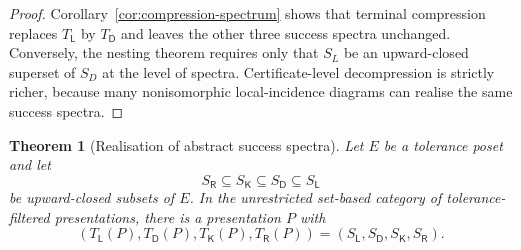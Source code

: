 \documentclass[11pt]{article}
\theoremstyle{plain}
\newtheorem{theorem}{Theorem}[section]
\theoremstyle{definition}
\theoremstyle{remark}
\begin{document}
\begin{proof}
Corollary~\ref{cor:compression-spectrum} shows that terminal compression replaces
$T_{\mathsf L}$ by $T_{\mathsf D}$ and leaves the other three success spectra
unchanged. Conversely, the nesting theorem requires only that $S_L$ be an
upward-closed superset of $S_D$ at the level of spectra. Certificate-level
decompression is strictly richer, because many nonisomorphic local-incidence
diagrams can realise the same success spectra.
\end{proof}

\begin{theorem}[Realisation of abstract success spectra]
\label{thm:abstract-spectrum-realisation}
Let $E$ be a tolerance poset and let
\[
S_{\mathsf R}\subseteq S_{\mathsf K}\subseteq S_{\mathsf D}\subseteq S_{\mathsf L}
\]
be upward-closed subsets of $E$. In the unrestricted set-based category of
tolerance-filtered presentations, there is a presentation $P$ with
\[
(T_{\mathsf L}(P),T_{\mathsf D}(P),T_{\mathsf K}(P),T_{\mathsf R}(P))
=(S_{\mathsf L},S_{\mathsf D},S_{\mathsf K},S_{\mathsf R}).
\]
\end{theorem}
\end{document}
